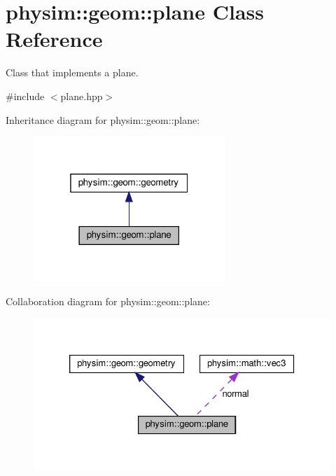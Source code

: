 \hypertarget{classphysim_1_1geom_1_1plane}{}\section{physim\+:\+:geom\+:\+:plane Class Reference}
\label{classphysim_1_1geom_1_1plane}


Class that implements a plane.  




{\ttfamily \#include $<$plane.\+hpp$>$}



Inheritance diagram for physim\+:\+:geom\+:\+:plane\+:\nopagebreak
\begin{figure}[H]
\begin{center}
\leavevmode
\includegraphics[width=205pt]{classphysim_1_1geom_1_1plane__inherit__graph}
\end{center}
\end{figure}


Collaboration diagram for physim\+:\+:geom\+:\+:plane\+:\nopagebreak
\begin{figure}[H]
\begin{center}
\leavevmode
\includegraphics[width=326pt]{classphysim_1_1geom_1_1plane__coll__graph}
\end{center}
\end{figure}
